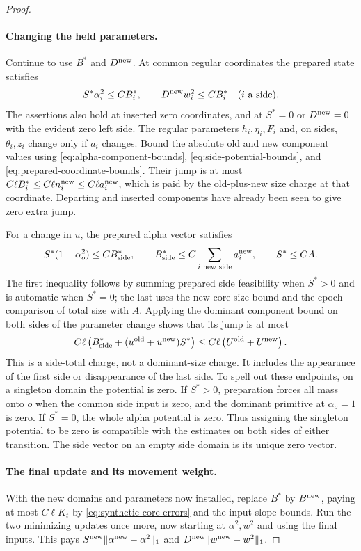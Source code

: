 \begin{proof}
\paragraph{Changing the held parameters.}
Continue to use $B^*$ and $D^{\rm new}$.  At common regular
coordinates the prepared state satisfies
\begin{equation}\label{eq:prepared-coordinate-bounds}
 S^*\alpha_i^2\le CB_i^*,\qquad
 D^{\rm new}w_i^2\le CB_i^*\quad(i\text{ a side}).
\end{equation}
The assertions also hold at inserted zero coordinates, and at
$S^*=0$ or $D^{\rm new}=0$ with the evident zero left side.
The regular parameters $h_i,\eta_i,F_i$ and, on sides,
$\theta_i,z_i$ change only if $a_i$ changes.  Bound the absolute
old and new component values using
\eqref{eq:alpha-component-bounds},
\eqref{eq:side-potential-bounds}, and
\eqref{eq:prepared-coordinate-bounds}.  Their jump is at most
$C\ell B_i^*\le C\ell n_i^{\rm new}\le C\ell a_i^{\rm new}$,
which is paid by the old-plus-new size charge at that coordinate.
Departing and inserted components have already been seen to give
zero extra jump.

For a change in $u$, the prepared alpha vector satisfies
\[
 S^*(1-\alpha_o^2)\le C B_{\rm side}^*,\qquad
 B_{\rm side}^*\le C\sum_{i\text{ new side}}a_i^{\rm new},
 \qquad S^*\le C A.
\]
The first inequality follows by summing prepared side feasibility
when $S^*>0$ and is automatic when $S^*=0$; the last uses the
new core-size bound and the epoch comparison of total size with
$A$.  Applying the dominant component bound on both sides of
the parameter change shows that its jump is at most
\[
 C\ell\left(B_{\rm side}^*+
                  (u^{\rm old}+u^{\rm new})S^*\right)
 \le C\ell\left(U^{\rm old}+U^{\rm new}\right).
\]
This is a side-total charge, not a dominant-size charge.
It includes the appearance of the first side or disappearance of
the last side.  To spell out these endpoints, on a singleton
domain the potential is zero.  If $S^*>0$, preparation forces
all mass onto $o$ when the common side input is zero, and the
dominant primitive at $\alpha_o=1$ is zero.  If $S^*=0$, the
whole alpha potential is zero.  Thus assigning the singleton
potential to be zero is compatible with the estimates on both
sides of either transition.  The side vector on an empty side
domain is its unique zero vector.

\paragraph{The final update and its movement weight.}
With the new domains and parameters now installed, replace $B^*$
by $B^{\rm new}$, paying at most $C\ell K_t$ by
\eqref{eq:synthetic-core-errors} and the input slope bounds.
Run the two minimizing updates once more, now starting at
$\alpha^2,w^2$ and using the final inputs.  This pays
$S^{\rm new}\|\alpha^{\rm new}-\alpha^2\|_1$ and
$D^{\rm new}\|w^{\rm new}-w^2\|_1$.


\end{proof}
